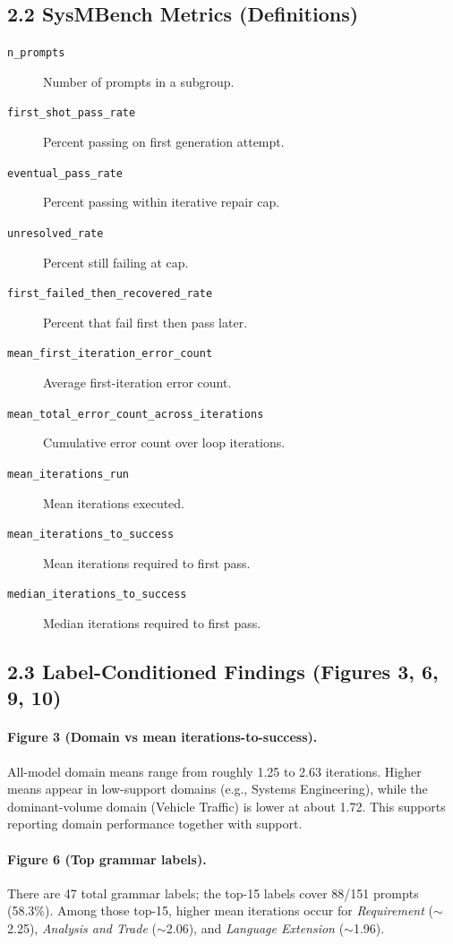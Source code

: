 \documentclass[11pt]{article}
\begin{document}
\subsection*{2.2 SysMBench Metrics (Definitions)}
\begin{description}
    \item[\texttt{n\_prompts}] Number of prompts in a subgroup.
    \item[\texttt{first\_shot\_pass\_rate}] Percent passing on first generation attempt.
    \item[\texttt{eventual\_pass\_rate}] Percent passing within iterative repair cap.
    \item[\texttt{unresolved\_rate}] Percent still failing at cap.
    \item[\texttt{first\_failed\_then\_recovered\_rate}] Percent that fail first then pass later.
    \item[\texttt{mean\_first\_iteration\_error\_count}] Average first-iteration error count.
    \item[\texttt{mean\_total\_error\_count\_across\_iterations}] Cumulative error count over loop iterations.
    \item[\texttt{mean\_iterations\_run}] Mean iterations executed.
    \item[\texttt{mean\_iterations\_to\_success}] Mean iterations required to first pass.
    \item[\texttt{median\_iterations\_to\_success}] Median iterations required to first pass.
\end{description}

\subsection*{2.3 Label-Conditioned Findings (Figures 3, 6, 9, 10)}
\paragraph{Figure 3 (Domain vs mean iterations-to-success).}
All-model domain means range from roughly 1.25 to 2.63 iterations. Higher means appear in low-support domains (e.g., Systems Engineering), while the dominant-volume domain (Vehicle Traffic) is lower at about 1.72. This supports reporting domain performance together with support.

\paragraph{Figure 6 (Top grammar labels).}
There are 47 total grammar labels; the top-15 labels cover 88/151 prompts (58.3\%). Among those top-15, higher mean iterations occur for \emph{Requirement} (\(\sim\)2.25), \emph{Analysis and Trade} (\(\sim\)2.06), and \emph{Language Extension} (\(\sim\)1.96).
\end{document}
